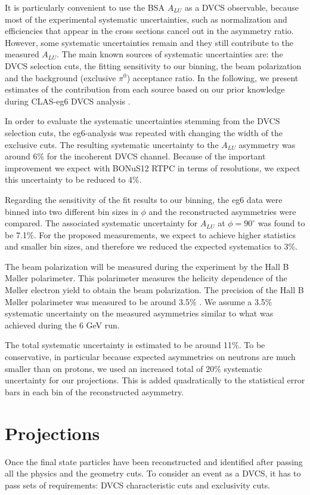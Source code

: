 It is particularly convenient to use the BSA $A_{LU}$ as a DVCS observable, 
because most of the experimental systematic uncertainties, such as 
normalization and efficiencies that appear in the cross sections cancel out in 
the asymmetry ratio. However, some systematic uncertainties remain and they 
still contribute to the measured $A_{LU}$. The main known sources of systematic 
uncertainties are: the DVCS selection cuts, the fitting sensitivity to our 
binning, the beam polarization and the background (exclusive $\pi^0$) 
acceptance ratio. In the following, we present estimates of the contribution 
from each source based on our prior knowledge during CLAS-eg6 DVCS analysis 
\cite{eg6_note}.

In order to evaluate the systematic uncertainties stemming from the DVCS 
selection cuts, the eg6-analysis was repeated with changing the width of the 
exclusive cuts. The resulting systematic uncertainty to the $A_{LU}$ asymmetry
was around 6$\%$ for the incoherent DVCS channel. Because of the important 
improvement we expect with BONuS12 RTPC in terms of resolutions, we expect this 
uncertainty to be reduced to 4$\%$.

Regarding the sensitivity of the fit results to our binning, the eg6 data were 
binned into two different bin sizes in $\phi$ and the reconstructed asymmetries 
were compared. The associated systematic uncertainty for $A_{LU}$ at $\phi = 90 
^{\circ}$ was found to be 7.1$\%$. For the proposed measurements, we expect to 
achieve higher statistics and smaller bin sizes, and therefore we reduced the 
expected systematics to 3$\%$.
   
The beam polarization will be measured during the experiment by the Hall B 
M\o{}ller polarimeter. This polarimeter measures the helicity dependence of the 
M\o{}ller electron yield to obtain the beam polarization. The precision of the 
Hall B M\o{}ller polarimeter was measured to be around 3.5$\%$ 
\cite{PhysRevSTAB.7.042802}.  We assume a 3.5$\%$ systematic uncertainty on the 
measured asymmetries similar to what was achieved during the 6 GeV run.

The total systematic uncertainty is estimated to be around 11\%. To be 
conservative, in particular because expected asymmetries on neutrons are
much smaller than on protons, we used an increased total of 20\% 
systematic uncertainty for our projections. This is added quadratically to the statistical error 
bars in each bin of the reconstructed asymmetry.

\section{Projections}
Once the final state particles have been reconstructed and identified after 
passing all the physics and the geometry cuts. To consider an event as a DVCS, 
it has to pass sets of requirements: DVCS characteristic cuts and exclusivity 
cuts.

